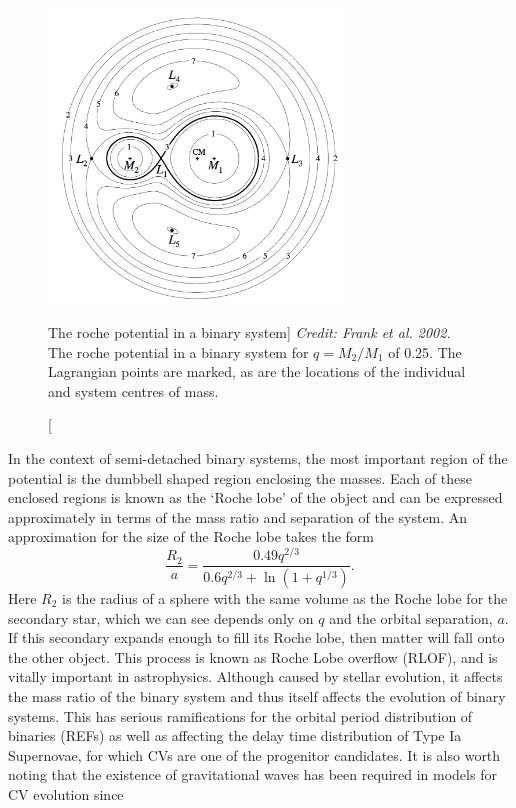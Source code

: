 \begin{figure}
\centering
\includegraphics[width=0.7\textwidth]{figures/01-intro/roche_potential.png}
\caption
[The roche potential in a binary system]
{
{\sl Credit: Frank et al. 2002.} 
The roche potential in a binary system for $q = M_2 / M_1$ of 0.25.
The Lagrangian points are marked, as are the locations of the individual
and system centres of mass.
} 
\label{fig:roche}
\end{figure}

In the context of semi-detached binary systems, the most important region of the 
potential is the dumbbell shaped region enclosing the masses. Each of these
enclosed regions is known as the `Roche lobe' of the object and can be expressed 
approximately in terms of the mass ratio and separation of the system. An approximation for the size of the Roche lobe takes the form \citep{eggleton1983}
\begin{equation}
\frac{R_2}{a} = \frac{0.49 q^{2/3}}{0.6q^{2/3} + \ln(1+q^{1/3})}.
\label{eq:roche2}
\end{equation} 
Here $R_2$ is the radius of a sphere with the same volume as the Roche lobe for the
secondary star, which we can see depends only on $q$ and the orbital separation, 
$a$. If this secondary expands enough to fill its Roche lobe, then matter
will fall onto the other object. This process is known as Roche Lobe overflow (RLOF),
and is vitally important in astrophysics. Although caused by stellar evolution,
it affects the mass ratio of the binary system and thus itself affects the evolution
of binary systems. This has serious ramifications for the orbital period
distribution of binaries (REFs) as well as affecting the delay time distribution
of Type Ia Supernovae, for which CVs are one of the progenitor candidates.
It is also worth noting that the existence of gravitational waves has been 
required in models for CV evolution since 


